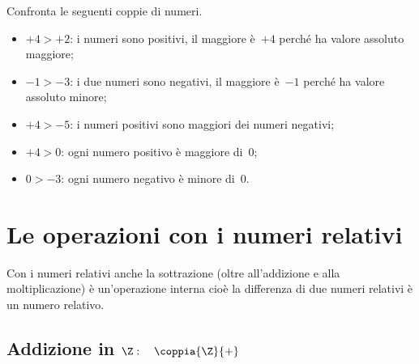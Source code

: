 \begin{esempio}{}{}
Confronta le seguenti coppie di numeri.
\begin{itemize} [noitemsep]
\item \(+4 > +2\): i numeri sono positivi, il maggiore è~\(+4\) perché ha 
valore assoluto maggiore;
\item \(-1 > -3\): i due numeri sono negativi, il maggiore è~\(-1\) perché 
ha valore assoluto minore;
\item \(+4 > -5\): i numeri positivi sono maggiori dei numeri negativi;
\item \(+4 > 0\): ogni numero positivo è maggiore di~0;
\item \(0 > -3\): ogni numero negativo è minore di~0.
\end{itemize}
{\rettaconfronto}
\end{esempio}


\section{Le operazioni con i numeri relativi}
\label{sec:int_operazioni}

Con i numeri relativi anche la sottrazione (oltre all'addizione e alla 
moltiplicazione) è un'operazione interna 
cioè la differenza di due numeri relativi è un numero relativo.

\subsection{Addizione in 
\texorpdfstring{$\Z: \quad \coppia{\Z}{+}$}{Z: (Z; +)}}
\indc{\(\Z\)}{\(\coppia{\Z}{+}\)}


